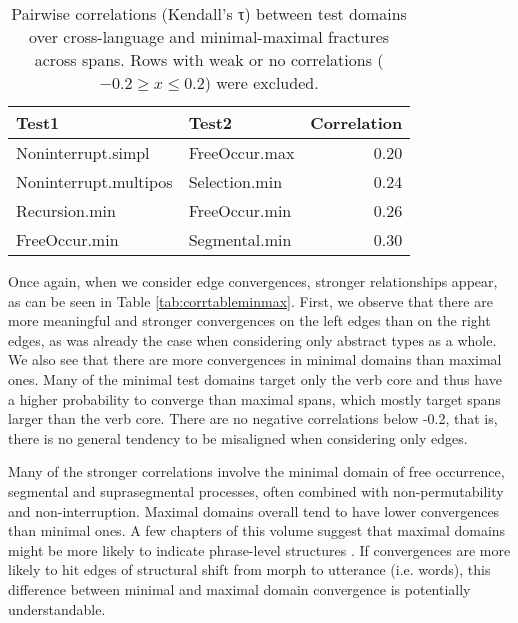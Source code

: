 \documentclass[output=paper,draftmode]{langscibook}
\begin{document}
\begin{table}
\caption{Pairwise correlations (Kendall's τ) between test domains over cross-language and minimal-maximal fractures across spans. Rows with weak or no correlations ($-0.2 ≥ x ≤ 0.2$) were excluded.}
\label{tab:corrtablespan}
\centering
\begin{tabular}{llr}
\toprule
Test1 & Test2 & Correlation \\
\midrule
Noninterrupt.simpl & FreeOccur.max      & \cellcolor{red!25}0.20\\
Noninterrupt.multipos & Selection.min   & \cellcolor{red!25}0.24 \\
Recursion.min & FreeOccur.min           & \cellcolor{red!25}0.26 \\
FreeOccur.min & Segmental.min           & \cellcolor{red!25}0.30 \\
\bottomrule
\end{tabular}
\end{table}

Once again, when we consider edge convergences, stronger relationships appear, as can be seen in Table  \ref{tab:corrtableminmax}. 
First, we observe that there are more meaningful and stronger convergences on the left edges than on the right edges, as was already the case when considering only abstract types as a whole.
We also see that there are more convergences in minimal domains than maximal ones. Many of the minimal test domains target only the verb core and thus have a higher probability to converge than maximal spans, which mostly target spans larger than the verb core.
There are no negative correlations below -0.2, that is, there is no general tendency to be misaligned when considering only edges.

Many of the stronger correlations involve the minimal domain of free occurrence, segmental and suprasegmental processes, often combined with non-permutability and non-interruption.
Maximal domains overall tend to have lower convergences than minimal ones. A few chapters of this volume suggest that maximal domains might be more likely to indicate phrase-level structures \citep{chapters/07-Zapotec, chapters/13-Araona}. If convergences are more likely to hit edges of structural shift from morph to utterance (i.e. words), this difference between minimal and maximal domain convergence is potentially understandable. 
\end{document}
